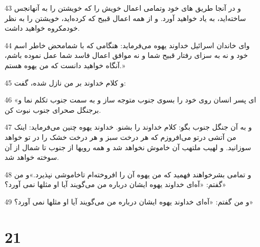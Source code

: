 \par 43 و در آنجا طریق های خود وتمامی اعمال خویش را که خویشتن را به آنهانجس ساخته‌اید، به یاد خواهید آورد. و از همه اعمال قبیح که کرده‌اید، خویشتن را به نظر خودمکروه خواهید داشت.
\par 44 و‌ای خاندان اسرائیل خداوند یهوه می‌فرماید: هنگامی که با شمامحض خاطر اسم خود و نه به سزای رفتار قبیح شما و نه موافق اعمال فاسد شما عمل نموده باشم، آنگاه خواهید دانست که من یهوه هستم.»
\par 45 و کلام خداوند بر من نازل شده، گفت:
\par 46 «ای پسر انسان روی خود را بسوی جنوب متوجه ساز و به سمت جنوب تکلم نما و برجنگل صحرای جنوب نبوت کن.
\par 47 و به آن جنگل جنوب بگو: کلام خداوند را بشنو. خداوند یهوه چنین می‌فرماید: اینک من آتشی درتو می‌افروزم که هر درخت سبز و هر درخت خشک را در تو خواهد سوزانید. و لهیب ملتهب آن خاموش نخواهد شد و همه رویها از جنوب تا شمال از آن سوخته خواهد شد.
\par 48 و تمامی بشرخواهند فهمید که من یهوه آن را افروخته‌ام تاخاموشی نپذیرد.»و من گفتم: «آه‌ای خداوند یهوه ایشان درباره من می‌گویند آیا او مثلها نمی آورد؟»
\par 49 و من گفتم: «آه‌ای خداوند یهوه ایشان درباره من می‌گویند آیا او مثلها نمی آورد؟»

\chapter{21}

